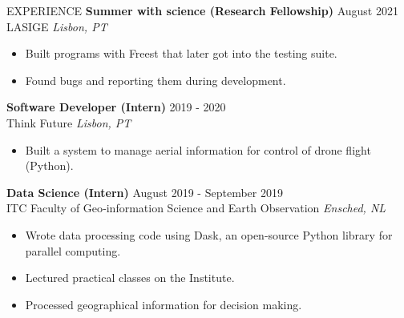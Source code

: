 \documentclass{resume} %
\begin{document}
\begin{rSection}{EXPERIENCE}
  \textbf{Summer with science (Research Fellowship)} \hfill August 2021 \\
  LASIGE \hfill \textit{Lisbon, PT}
  \begin{itemize}
    \itemsep -3pt {} 
  \item Built programs with Freest that later got into the testing suite.
  \item Found bugs and reporting them during development.
  \end{itemize}

  \textbf{Software Developer (Intern)} \hfill 2019 - 2020 \\
  Think Future \hfill \textit{Lisbon, PT}
  \begin{itemize}
    \itemsep -3pt {} 
  \item Built a system to manage aerial information for control of drone flight (Python).
  \end{itemize}

  \textbf{Data Science (Intern)} \hfill August 2019 - September 2019 \\
  ITC Faculty of Geo‑information Science and Earth Observation \hfill \textit{Ensched, NL}
  \begin{itemize}
    \itemsep -3pt {} 
  \item Wrote data processing code using Dask, an open-source Python library for parallel computing.
  \item Lectured practical classes on the Institute.
  \item Processed geographical information for decision making.
  \end{itemize}
\end{rSection} 



\end{document}
